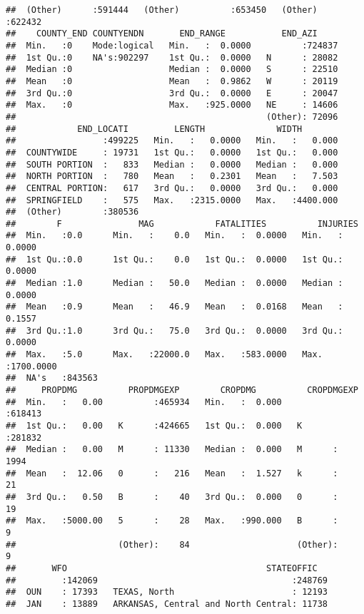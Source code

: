 \documentclass[
]{article}
\begin{document}
\begin{verbatim}
##  (Other)      :591444   (Other)          :653450   (Other)    :622432  
##    COUNTY_END COUNTYENDN       END_RANGE           END_AZI      
##  Min.   :0    Mode:logical   Min.   :  0.0000          :724837  
##  1st Qu.:0    NA's:902297    1st Qu.:  0.0000   N      : 28082  
##  Median :0                   Median :  0.0000   S      : 22510  
##  Mean   :0                   Mean   :  0.9862   W      : 20119  
##  3rd Qu.:0                   3rd Qu.:  0.0000   E      : 20047  
##  Max.   :0                   Max.   :925.0000   NE     : 14606  
##                                                 (Other): 72096  
##            END_LOCATI         LENGTH              WIDTH         
##                 :499225   Min.   :   0.0000   Min.   :   0.000  
##  COUNTYWIDE     : 19731   1st Qu.:   0.0000   1st Qu.:   0.000  
##  SOUTH PORTION  :   833   Median :   0.0000   Median :   0.000  
##  NORTH PORTION  :   780   Mean   :   0.2301   Mean   :   7.503  
##  CENTRAL PORTION:   617   3rd Qu.:   0.0000   3rd Qu.:   0.000  
##  SPRINGFIELD    :   575   Max.   :2315.0000   Max.   :4400.000  
##  (Other)        :380536                                         
##        F               MAG            FATALITIES          INJURIES        
##  Min.   :0.0      Min.   :    0.0   Min.   :  0.0000   Min.   :   0.0000  
##  1st Qu.:0.0      1st Qu.:    0.0   1st Qu.:  0.0000   1st Qu.:   0.0000  
##  Median :1.0      Median :   50.0   Median :  0.0000   Median :   0.0000  
##  Mean   :0.9      Mean   :   46.9   Mean   :  0.0168   Mean   :   0.1557  
##  3rd Qu.:1.0      3rd Qu.:   75.0   3rd Qu.:  0.0000   3rd Qu.:   0.0000  
##  Max.   :5.0      Max.   :22000.0   Max.   :583.0000   Max.   :1700.0000  
##  NA's   :843563                                                           
##     PROPDMG          PROPDMGEXP        CROPDMG          CROPDMGEXP    
##  Min.   :   0.00          :465934   Min.   :  0.000          :618413  
##  1st Qu.:   0.00   K      :424665   1st Qu.:  0.000   K      :281832  
##  Median :   0.00   M      : 11330   Median :  0.000   M      :  1994  
##  Mean   :  12.06   0      :   216   Mean   :  1.527   k      :    21  
##  3rd Qu.:   0.50   B      :    40   3rd Qu.:  0.000   0      :    19  
##  Max.   :5000.00   5      :    28   Max.   :990.000   B      :     9  
##                    (Other):    84                     (Other):     9  
##       WFO                                       STATEOFFIC    
##         :142069                                      :248769  
##  OUN    : 17393   TEXAS, North                       : 12193  
##  JAN    : 13889   ARKANSAS, Central and North Central: 11738  

\end{verbatim}
\end{document}
